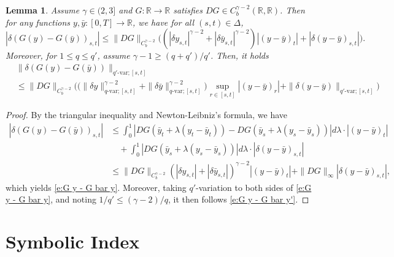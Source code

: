 \documentclass[11pt,reqno]{amsart}
\newtheorem{lemma}{Lemma}[section]
\numberwithin{equation}{section}
\def\R{\mathbb R}
\begin{document}
\begin{lemma}\label{lem:gamma - 2}
Assume $\gamma \in (2,3]$ and $G:\R\to \R$ satisfies $DG \in C^{\gamma - 2}_b(\R,\R)$. Then for any functions $y,\bar y:[0,T] \to \R$, we have for all $(s,t) \in \Delta$, 
\begin{equation}\label{e:G y - G bar y}
|\delta (G(y) - G(\bar y))_{s,t}| \le \|DG\|_{C^{\gamma - 2}_b} \Big( (|\delta y_{s,t}|^{\gamma - 2} + |\delta \bar y_{s,t}|^{\gamma - 2}) |(y - \bar y)_{t}| + |\delta (y - \bar y)_{s,t}| \Big).
\end{equation}
Moreover, for $1 \le q \le q'$, assume $\gamma - 1 \ge (q+q')/q'$. Then, it holds 
\begin{equation}\label{e:G y - G bar y'}
\begin{aligned}
&\|\delta (G(y) - G(\bar y))\|_{q'\text{-}\mathrm{var};[s,t]} \\
&\le \|DG\|_{C^{\gamma - 2}_b} \Big( \big( \|\delta y\|_{q\text{-}\mathrm{var};[s,t]}^{\gamma - 2} + \|\delta \bar y\|_{q\text{-}\mathrm{var};[s,t]}^{\gamma - 2}\big) \sup_{r\in[s,t]}|(y - \bar y)_r| + \|\delta (y - \bar y)\|_{q'\text{-}\mathrm{var};[s,t]} \Big)
\end{aligned}
\end{equation}
\end{lemma}

\begin{proof}
By the triangular inequality and Newton-Leibniz's formula, we have 
\begin{equation*}
\begin{aligned}
|\delta (G(y) - G(\bar y))_{s,t}| &\le \int_{0}^{1} |DG (\bar y_{t} + \lambda (y_t - \bar y_{t}) ) - DG (\bar y_{s} + \lambda (y_s - \bar y_{s}) )| d \lambda \cdot | (y - \bar y)_{t} | \\
& \quad + \int_{0}^{1} |DG(\bar y_s + \lambda(y_{s} - \bar y_{s}))| d \lambda \cdot |\delta(y - \bar y)_{s,t}|\\
&\le \|DG\|_{C^{\gamma - 2}_b} (|\delta y_{s,t}| + |\delta \bar y_{s,t}|)^{\gamma - 2} |(y - \bar y)_{t}| + \|DG\|_{\infty} |\delta (y - \bar y)_{s,t}|,
\end{aligned}
\end{equation*}
which yields \eqref{e:G y - G bar y}. Moreover, taking $q'$-variation to both sides of \eqref{e:G y - G bar y}, and noting $1/q' \le (\gamma - 2)/q$, it then follows \eqref{e:G y - G bar y'}.  
\end{proof}


\section{Symbolic Index}\label{app:symbolic_index}
\end{document}

